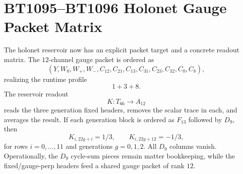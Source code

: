 \section{BT1095--BT1096 Holonet Gauge Packet Matrix}
\label{sec:bt1095-bt1096-holonet-a12-k-matrix}

The holonet reservoir now has an explicit packet target and a concrete readout matrix.  The $12$-channel gauge packet is ordered as
\[
(Y,W_0,W_+,W_-,C_{12},C_{21},C_{13},C_{31},C_{23},C_{32},C_0,C_8),
\]
realizing the runtime profile
\[
1+3+8.
\]
The reservoir readout
\[
K:T_{66}\to A_{12}
\]
reads the three generation fixed headers, removes the scalar trace in each, and averages the result.  If each generation block is ordered as $F_{13}$ followed by $D_9$, then
\[
K_{i,22g+i}=1/3,
\qquad
K_{i,22g+12}=-1/3,
\]
for rows $i=0,\ldots,11$ and generations $g=0,1,2$.  All $D_9$ columns vanish.  Operationally, the $D_9$ cycle-sum pieces remain matter bookkeeping, while the fixed/gauge-perp headers feed a shared gauge packet of rank $12$.
